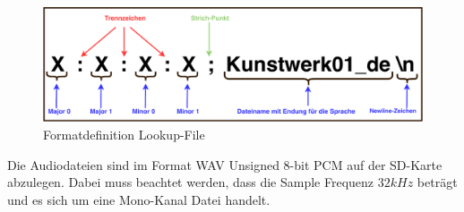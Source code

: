 \begin{figure}[H]
	\begin{center}
		\includegraphics[width=140mm]{data/Definition_picture}
		\caption[Formatdefinition Lookup-File]{Formatdefinition Lookup-File} %
		\label{fig:definition_lookup_file}
	\end{center}
\end{figure}

Die Audiodateien sind im Format WAV Unsigned 8-bit PCM auf der SD-Karte abzulegen. Dabei muss beachtet werden, dass die Sample Frequenz $32 kHz$ beträgt und es sich um eine Mono-Kanal Datei handelt.
